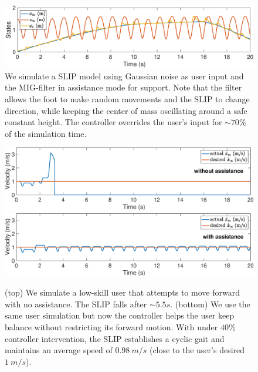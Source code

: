 \begin{figure}[!t]
\begin{center}
   	\includegraphics[width=1\columnwidth, keepaspectratio]{SLIP_noise_states.eps}
\end{center}
\caption{We simulate a SLIP model using Gaussian noise as user input and the MIG-filter in assistance mode for support. Note that the filter allows the foot to make random movements and the SLIP to change direction, while keeping the center of mass oscillating around a safe constant height. The controller overrides the user's input for $\sim70\%$ of the simulation time.}

\label{fig: SLIP_noise}
\end{figure}
\begin{figure}[!t]
\begin{center}
  	\includegraphics[width=1\columnwidth, keepaspectratio]{SLIP1_noassist_velocity.eps}
  	\includegraphics[width=1\columnwidth, keepaspectratio]{SLIP1_assist_velocity.eps}
\end{center}
\caption{(top) We simulate a low-skill user that attempts to move forward with no assistance. The SLIP falls after $\sim5.5s$. (bottom) We use the same user simulation but now the controller helps the user keep balance without restricting its forward motion. With under $40\%$ controller intervention, the SLIP establishes a cyclic gait and maintains an average speed of $0.98~m/s$ (close to the user's desired $1~m/s$).}
\label{fig: SLIP_weak}
\end{figure}

